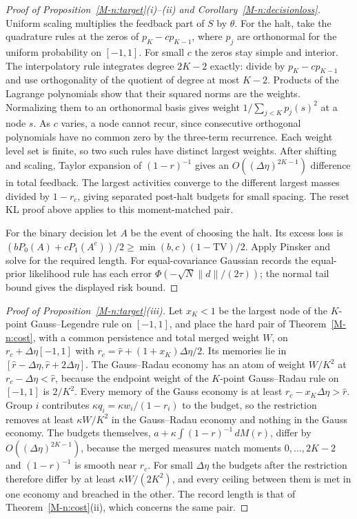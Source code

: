 \documentclass[12pt]{article}
\theoremstyle{definition}
\theoremstyle{remark}
\providecommand{\TV}{\mathrm{TV}}\providecommand{\Var}{\mathrm{Var}}\providecommand{\supp}{\mathrm{supp}}
\begin{document}
\begin{proof}[Proof of Proposition~\ref{M-n:target}(i)--(ii) and Corollary~\ref{M-n:decisionloss}]
Uniform scaling multiplies the feedback part of $S$ by $\theta$. For the halt, take the quadrature rules at the zeros of $p_K-cp_{K-1}$, where $p_j$ are orthonormal for the uniform probability on $[-1,1]$. For small $c$ the zeros stay simple and interior. The interpolatory rule integrates degree $2K-2$ exactly: divide by $p_K-cp_{K-1}$ and use orthogonality of the quotient of degree at most $K-2$. Products of the Lagrange polynomials show that their squared norms are the weights. Normalizing them to an orthonormal basis gives weight $1/\sum_{j<K}p_j(s)^2$ at a node $s$. As $c$ varies, a node cannot recur, since consecutive orthogonal polynomials have no common zero by the three-term recurrence. Each weight level set is finite, so two such rules have distinct largest weights. After shifting and scaling, Taylor expansion of $(1-r)^{-1}$ gives an $O((\Delta\eta)^{2K-1})$ difference in total feedback. The largest activities converge to the different largest masses divided by $1-r_c$, giving separated post-halt budgets for small spacing. The reset KL proof above applies to this moment-matched pair.

For the binary decision let $A$ be the event of choosing the halt. Its excess loss is $(bP_0(A)+cP_1(A^c))/2\ge \min(b,c)(1-\TV)/2$. Apply Pinsker and solve for the required length. For equal-covariance Gaussian records the equal-prior likelihood rule has each error $\Phi(-\sqrt{N}\|d\|/(2\tau))$; the normal tail bound gives the displayed risk bound.
\end{proof}

\begin{proof}[Proof of Proposition~\ref{M-n:target}(iii)]
Let $x_K < 1$ be the largest node of the $K$-point Gauss--Legendre rule on $[-1, 1]$, and place the hard pair of Theorem~\ref{M-n:cost}, with a common persistence and total merged weight $W$, on $r_c + \Delta\eta[-1, 1]$ with $r_c = \hat r + (1 + x_K)\Delta\eta/2$. Its memories lie in $[\hat r - \Delta\eta, \hat r + 2\Delta\eta]$. The Gauss--Radau economy has an atom of weight $W/K^2$ at $r_c - \Delta\eta < \hat r$, because the endpoint weight of the $K$-point Gauss--Radau rule on $[-1, 1]$ is $2/K^2$. Every memory of the Gauss economy is at least $r_c - x_K\Delta\eta > \hat r$. Group $i$ contributes $\kappa q_i = \kappa w_i/(1 - r_i)$ to the budget, so the restriction removes at least $\kappa W/K^2$ in the Gauss--Radau economy and nothing in the Gauss economy. The budgets themselves, $a + \kappa\int (1 - r)^{-1}\,dM(r)$, differ by $O((\Delta\eta)^{2K-1})$, because the merged measures match moments $0, \dots, 2K-2$ and $(1 - r)^{-1}$ is smooth near $r_c$. For small $\Delta\eta$ the budgets after the restriction therefore differ by at least $\kappa W/(2K^2)$, and every ceiling between them is met in one economy and breached in the other. The record length is that of Theorem~\ref{M-n:cost}(ii), which concerns the same pair.
\end{proof}
\end{document}
